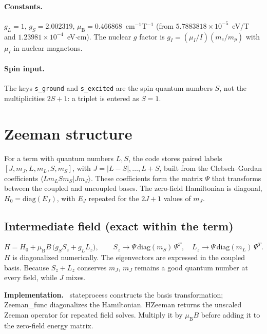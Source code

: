 \documentclass[11pt,a4paper]{article}
\newcommand{\code}[1]{\texttt{#1}}
\newcommand{\routine}[1]{\textsf{#1}}
\newenvironment{implnote}[1][Implementation]{%
  \par\smallskip\noindent\begin{lrbox}{\notebox}\setlength{\fboxsep}{6pt}\begin{minipage}{\dimexpr\linewidth-2\fboxsep-2\fboxrule\relax}\small\textbf{#1.}\ }{%
  \end{minipage}\end{lrbox}\setlength{\fboxsep}{6pt}\fcolorbox{noteframe}{notebg}{\usebox{\notebox}}\par\smallskip}
\numberwithin{equation}{section}
\newcommand{\muB}{\mu_{\mathrm B}}
\begin{document}
\paragraph{Constants.} $g_L=1$, $g_S=2.002319$, $\muB=0.466868$~cm$^{-1}$T$^{-1}$ (from $5.7883818\times10^{-5}$~eV/T and $1.23981\times10^{-4}$~eV$\cdot$cm). The nuclear $g$ factor is $g_I=(\mu_I/I)(m_e/m_p)$ with $\mu_I$ in nuclear magnetons.

\paragraph{Spin input.} The keys \code{s\_ground} and \code{s\_excited} are the spin quantum numbers $S$, not the multiplicities $2S+1$: a triplet is entered as $S=1$.

\section{Zeeman structure}\label{sec:zeeman}

For a term with quantum numbers $L,S$, the code stores paired labels $[J,m_J,L,m_L,S,m_S]$, with $J=\vert L-S\vert,\dots,L+S$, built from the Clebsch--Gordan coefficients $\langle L m_L S m_S\vert J m_J\rangle$. These coefficients form the matrix $\Psi$ that transforms between the coupled and uncoupled bases. The zero-field Hamiltonian is diagonal, $H_0=\mathrm{diag}(E_J)$, with $E_J$ repeated for the $2J+1$ values of $m_J$.

\subsection{Intermediate field (exact within the term)}
\begin{equation}
H = H_0 + \muB B\,\bigl(g_S S_z + g_L L_z\bigr),\qquad
S_z \to \Psi\,\mathrm{diag}(m_S)\,\Psi^{T},\quad L_z \to \Psi\,\mathrm{diag}(m_L)\,\Psi^{T}.
\end{equation}
$H$ is diagonalized numerically. The eigenvectors are expressed in the coupled basis. Because $S_z+L_z$ conserves $m_J$, $m_J$ remains a good quantum number at every field, while $J$ mixes.

\begin{implnote}
\routine{stateprocess} constructs the basis transformation;
\routine{Zeeman\_func} diagonalizes the Hamiltonian. \routine{HZeeman}
returns the unscaled Zeeman operator for repeated field solves. Multiply
it by $\muB B$ before adding it to the zero-field energy matrix.
\end{implnote}
\end{document}

